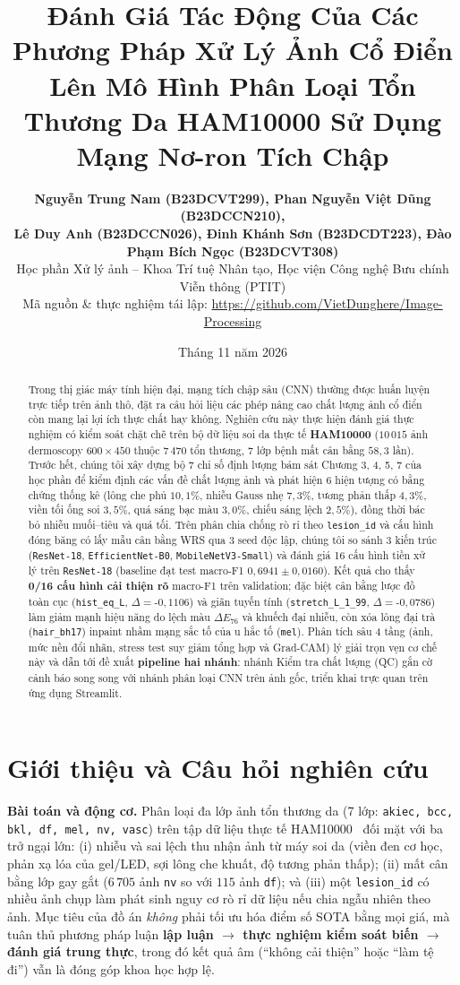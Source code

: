 \documentclass[10pt,twocolumn,a4paper]{article}
\title{\vspace{-0.8cm}\textbf{\Large Đánh Giá Tác Động Của Các Phương Pháp Xử Lý Ảnh Cổ Điển Lên Mô Hình Phân Loại Tổn Thương Da HAM10000 Sử Dụng Mạng Nơ-ron Tích Chập}}
\author{
\normalsize\textbf{Nguyễn Trung Nam (B23DCVT299), Phan Nguyễn Việt Dũng (B23DCCN210),}\\
\normalsize\textbf{Lê Duy Anh (B23DCCN026), Đinh Khánh Sơn (B23DCDT223), Đào Phạm Bích Ngọc (B23DCVT308)}\\
\small Học phần Xử lý ảnh -- Khoa Trí tuệ Nhân tạo, Học viện Công nghệ Bưu chính Viễn thông (PTIT)\\
\small Mã nguồn \& thực nghiệm tái lập: \url{https://github.com/VietDunghere/Image-Processing}
}
\date{\vspace{-0.3cm}\small Tháng 11 năm 2026}
\begin{document}
\maketitle

\begin{abstract}
\noindent Trong thị giác máy tính hiện đại, mạng tích chập sâu (CNN) thường được huấn luyện trực tiếp trên ảnh thô, đặt ra câu hỏi liệu các phép nâng cao chất lượng ảnh cổ điển còn mang lại lợi ích thực chất hay không. Nghiên cứu này thực hiện đánh giá thực nghiệm có kiểm soát chặt chẽ trên bộ dữ liệu soi da thực tế \textbf{HAM10000} ($10\,015$ ảnh dermoscopy $600{\times}450$ thuộc $7\,470$ tổn thương, 7 lớp bệnh mất cân bằng $58{,}3$ lần). Trước hết, chúng tôi xây dựng bộ 7 chỉ số định lượng bám sát Chương 3, 4, 5, 7 của học phần để kiểm định các vấn đề chất lượng ảnh và phát hiện 6 hiện tượng có bằng chứng thống kê (lông che phủ $10{,}1\%$, nhiễu Gauss nhẹ $7{,}3\%$, tương phản thấp $4{,}3\%$, viền tối ống soi $3{,}5\%$, quá sáng bạc màu $3{,}0\%$, chiếu sáng lệch $2{,}5\%$), đồng thời bác bỏ nhiễu muối--tiêu và quá tối. Trên phân chia chống rò rỉ theo \texttt{lesion\_id} và cấu hình đóng băng có lấy mẫu cân bằng WRS qua 3 seed độc lập, chúng tôi so sánh 3 kiến trúc (\texttt{ResNet-18}, \texttt{EfficientNet-B0}, \texttt{MobileNetV3-Small}) và đánh giá 16 cấu hình tiền xử lý trên \texttt{ResNet-18} (baseline đạt test macro-F1 $0{,}6941 \pm 0{,}0160$). Kết quả cho thấy \textbf{0/16 cấu hình cải thiện rõ} macro-F1 trên validation; đặc biệt cân bằng lược đồ toàn cục (\texttt{hist\_eq\_L}, $\Delta=$-$0{,}1106$) và giãn tuyến tính (\texttt{stretch\_L\_1\_99}, $\Delta=$-$0{,}0786$) làm giảm mạnh hiệu năng do lệch màu $\Delta E_{76}$ và khuếch đại nhiễu, còn xóa lông đại trà (\texttt{hair\_bh17}) inpaint nhầm mạng sắc tố của u hắc tố (\texttt{mel}). Phân tích sâu 4 tầng (ảnh, mức nền đổi nhãn, stress test suy giảm tổng hợp và Grad-CAM) lý giải trọn vẹn cơ chế này và dẫn tới đề xuất \textbf{pipeline hai nhánh}: nhánh Kiểm tra chất lượng (QC) gắn cờ cảnh báo song song với nhánh phân loại CNN trên ảnh gốc, triển khai trực quan trên ứng dụng Streamlit.
\end{abstract}

\section{Giới thiệu và Câu hỏi nghiên cứu}
\textbf{Bài toán và động cơ.} Phân loại đa lớp ảnh tổn thương da (7 lớp: \texttt{akiec, bcc, bkl, df, mel, nv, vasc}) trên tập dữ liệu thực tế HAM10000~\cite{tschandl2018ham10000} đối mặt với ba trở ngại lớn: (i) nhiễu và sai lệch thu nhận ảnh từ máy soi da (viền đen cơ học, phản xạ lóa của gel/LED, sợi lông che khuất, độ tương phản thấp); (ii) mất cân bằng lớp gay gắt ($6\,705$ ảnh \texttt{nv} so với $115$ ảnh \texttt{df}); và (iii) một \texttt{lesion\_id} có nhiều ảnh chụp làm phát sinh nguy cơ rò rỉ dữ liệu nếu chia ngẫu nhiên theo ảnh. Mục tiêu của đồ án \emph{không} phải tối ưu hóa điểm số SOTA bằng mọi giá, mà tuân thủ phương pháp luận \textbf{lập luận $\rightarrow$ thực nghiệm kiểm soát biến $\rightarrow$ đánh giá trung thực}, trong đó kết quả âm (``không cải thiện'' hoặc ``làm tệ đi'') vẫn là đóng góp khoa học hợp lệ.
\end{document}
